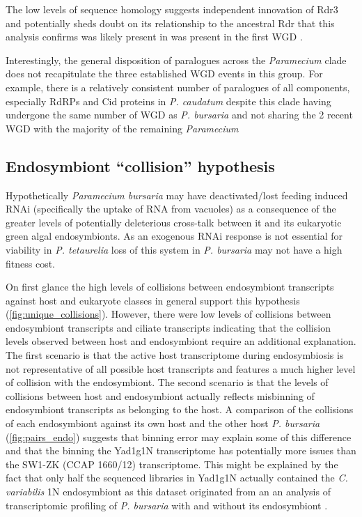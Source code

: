 The low levels of sequence homology suggests independent innovation 
of Rdr3 and potentially sheds doubt on its relationship to the ancestral
Rdr that this analysis confirms was likely present in 
was present in the first WGD \citep{Marker2014}.


Interestingly, the general disposition of paralogues across the \textit{Paramecium}
clade does not recapitulate the three established WGD events in this group.
For example, there is a relatively consistent number of paralogues of 
all components, especially RdRPs and Cid proteins in \textit{P. caudatum} 
despite this clade having undergone the same number of WGD as \textit{P. bursaria}
and not sharing the 2 recent WGD with the majority of the remaining \textit{Paramecium} 


\subsection{Endosymbiont ``collision'' hypothesis}

Hypothetically \textit{Paramecium bursaria}
may have deactivated/lost feeding induced RNAi (specifically the
uptake of RNA from vacuoles) as a consequence
of the greater levels of potentially deleterious cross-talk between
it and its eukaryotic green algal endosymbionts.  
As an exogenous RNAi response is not essential 
for viability in \textit{P. tetaurelia} \citep{Marker2014} loss
of this system in \textit{P. bursaria} may not have a high fitness cost.


On first glance the high levels of collisions between endosymbiont
transcripts against host and eukaryote classes in general support this
hypothesis (\cref{fig:unique_collisions}).
However, there were low levels of collisions between endosymbiont transcripts
and ciliate transcripts indicating that the collision levels
observed between host and endosymbiont require an additional explanation.
The first scenario is that the active host transcriptome during
endosymbiosis is not representative of all possible host transcripts
and features a much higher level of collision with the endosymbiont.
The second scenario is that the levels of collisions between host and
endosymbiont actually reflects misbinning of endosymbiont transcripts
as belonging to the host.  A comparison of the collisions
of each endosymbiont against its own host and the other host \textit{P. bursaria}
(\cref{fig:pairs_endo}) suggests that binning error may explain
some of this difference and that the binning the Yad1g1N transcriptome
has potentially more issues than the SW1-ZK (CCAP 1660/12) transcriptome.
This might be explained by the fact that only half the sequenced
libraries in Yad1g1N actually contained the \textit{C. variabilis} 1N endosymbiont
as this dataset originated from an an analysis of transcriptomic
profiling of \textit{P. bursaria} with and without its endosymbiont \citep{Kodama2014}.


